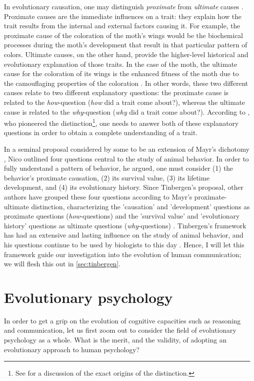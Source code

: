 In evolutionary causation, one may distinguish \emph{proximate} from \emph{ultimate} causes \citep{Mayr61}.
Proximate causes are the immediate influences on a trait: they explain how the trait results from the internal and external factors causing it. For example, the proximate cause of the coloration of the moth's wings would be the biochemical processes during the moth's development that result in that particular pattern of colors.
Ultimate causes, on the other hand, provide the higher-level historical and evolutionary explanation of those traits. In the case of the moth, the ultimate cause for the coloration of its wings is the enhanced fitness of the moth due to the camouflaging properties of the coloration \citep{Lipton09}. In other words, these two different causes relate to two different explanatory questions: the proximate cause is related to the \emph{how}-question (\emph{how} did a trait come about?), whereas the ultimate cause is related to the \emph{why}-question (\emph{why} did a trait come about?). According to \citet{Mayr61}, who pioneered the distinction\footnote{See \citet[p.~720]{Laland13} for a discussion of the exact origins of the distinction.}, one needs to answer both of these explanatory questions in order to obtain a complete understanding of a trait.

In a seminal proposal considered by some to be an extension of Mayr's dichotomy \citep{Laland13}, Nico \citet{Tinbergen63} outlined four questions central to the study of animal behavior. In order to fully understand a pattern of behavior, he argued, one must consider (1) the behavior's proximate causation, (2) its survival value, (3) its lifetime development, and (4) its evolutionary history.
Since Tinbergen's proposal, other authors have grouped these four questions according to Mayr's proximate-ultimate distinction, characterizing the 'causation' and 'development' questions as proximate questions (\emph{how}-questions) and the 'survival value' and 'evolutionary history' questions as ultimate questions (\emph{why}-questions) \citep{BatesonLaland13}.
Tinbergen's framework has had an extensive and lasting influence on the study of animal behavior, and his questions continue to be used by biologists to this day \citep{BatesonLaland13}. Hence, I will let this framework guide our investigation into the evolution of human communication; we will flesh this out in \cref{sec:tinbergen}.

\section{Evolutionary psychology}
\label{sec:evol-psych}
In order to get a grip on the evolution of cognitive capacities such as reasoning and communication, let us first
zoom out to consider the field of evolutionary psychology as a whole.
What is the merit, and the validity, of adopting an evolutionary approach to human psychology?

